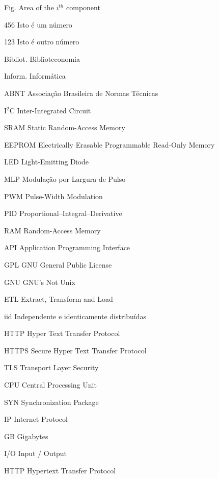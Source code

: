 \begin{siglas}
	\item[Fig.] Area of the $i^{th}$ component
	\item[456] Isto é um número
	\item[123] Isto é outro número
	\item [Bibliot.] Biblioteconomia
	\item [Inform.]  Informática
	\item [ABNT] Associação Brasileira de Normas Técnicas
	\item [I$^2$C] Inter-Integrated Circuit
	\item [SRAM] Static Random-Access Memory
	\item [EEPROM]	Electrically Erasable Programmable Read-Only Memory
	\item [LED] Light-Emitting Diode
	\item [MLP] Modulação por Largura de Pulso
	\item [PWM] Pulse-Width Modulation
	\item [PID] Proportional–Integral–Derivative
	\item [RAM] Random-Access Memory
	\item [API] Application Programming Interface
	\item [GPL] GNU General Public License
	\item [GNU] GNU's Not Unix
	\item [ETL] Extract, Transform and Load
	\item [iid] Independente e identicamente distribuídas
	\item [HTTP] Hyper Text Transfer Protocol
	\item [HTTPS] Secure Hyper Text Transfer Protocol
	\item [TLS] Transport Layer Security
	\item [CPU] Central Processing Unit
	\item [SYN] Synchronization Package
	\item [IP] Internet Protocol
	\item [GB] Gigabytes
	\item [I/O] Input / Output
	\item [HTTP] Hypertext Transfer Protocol
\end{siglas}